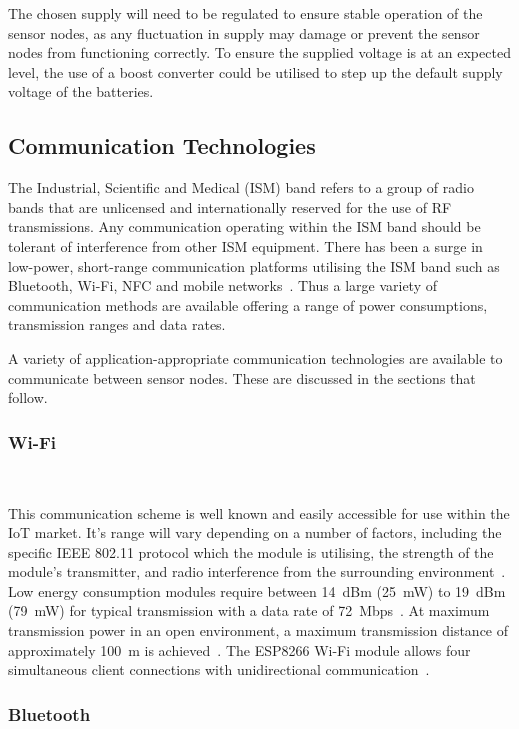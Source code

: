 \documentclass[10pt,twocolumn]{witseiepaper}
\begin{document}
			The chosen supply will need to be regulated to ensure stable operation of the sensor nodes, as any fluctuation in supply may damage or prevent the sensor nodes from functioning correctly. To ensure the supplied voltage is at an expected level, the use of a boost converter could be utilised to step up the default supply voltage of the batteries.
	
	\subsection{Communication Technologies}
	
		The Industrial, Scientific and Medical (ISM) band refers to a group of radio bands that are unlicensed and internationally reserved for the use of RF transmissions. Any communication operating within the ISM band should be tolerant of interference from other ISM equipment. There has been a surge in low-power, short-range communication platforms utilising the ISM band such as Bluetooth, \mbox{Wi-Fi}, NFC and mobile networks~\cite{ism}. Thus a large variety of communication methods are available offering a range of power consumptions, transmission ranges and data rates.
	
		A variety of application-appropriate communication technologies are available to communicate between sensor nodes. These are discussed in the sections that follow.
		
		\subsubsection{Wi-Fi} $   $
		
			This communication scheme is well known and easily accessible for use within the IoT market. It's range will vary depending on a number of factors, including the specific IEEE 802.11 protocol which the module is utilising, the strength of the module's transmitter, and radio interference from the surrounding environment~\cite{802.11}. Low energy consumption modules require between 14~dBm (25~mW) to 19~dBm (79~mW) for typical transmission with a data rate of 72~Mbps~\cite{esp12e}. At maximum transmission power in an open environment, a maximum transmission distance of approximately 100~m is achieved~\cite{esp12e}. The ESP8266 \mbox{Wi-Fi} module allows four simultaneous client connections with unidirectional communication~\cite{esp12e}.

		\subsubsection{Bluetooth} $   $
		
\end{document}
